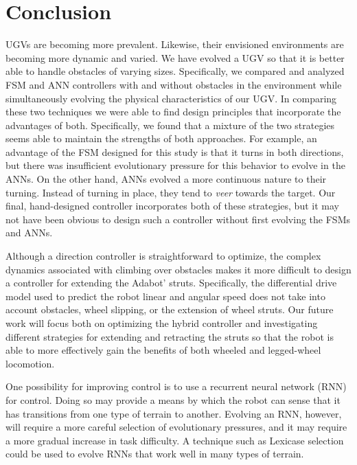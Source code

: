 \section{Conclusion}
\label{sec:conclusion}

UGVs are becoming more prevalent. Likewise, their envisioned environments are becoming more dynamic and varied.
%
We have evolved a UGV so that it is better able to handle obstacles of varying sizes.
%
Specifically, we compared and analyzed FSM and ANN controllers with and without obstacles in the environment while simultaneously evolving the physical characteristics of our UGV.
%
In comparing these two techniques we were able to find design principles that incorporate the advantages of both.
%
Specifically, we found that a mixture of the two strategies seems able to maintain the strengths of both approaches.
%
For example, an advantage of the FSM designed for this study is that it turns in both directions, but there was insufficient evolutionary pressure for this behavior to evolve in the ANNs. On the other hand, ANNs evolved a more continuous nature to their turning. Instead of turning in place, they tend to \emph{veer} towards the target.
%
Our final, hand-designed controller incorporates both of these strategies, but it may not have been obvious to design such a controller without first evolving the FSMs and ANNs.


Although a direction controller is straightforward to optimize, the complex dynamics associated with climbing over obstacles makes it more difficult to design a controller for extending the Adabot' struts.
%
Specifically, the differential drive model used to predict the robot linear and angular speed does not take into account obstacles, wheel slipping, or the extension of wheel struts.
%
Our future work will focus both on optimizing the hybrid controller and investigating different strategies for extending and retracting the struts so that the robot is able to more effectively gain the benefits of both wheeled and legged-wheel locomotion.

One possibility for improving control is to use a recurrent neural network (RNN) for control.
%
Doing so may provide a means by which the robot can sense that it has transitions from one type of terrain to another.
%
Evolving an RNN, however, will require a more careful selection of evolutionary pressures, and it may require a more gradual increase in task difficulty.
%
A technique such as Lexicase selection~\citep{Moore.2018.2CAL.TiebreaksDiversityIsolating} could be used to evolve RNNs that work well in many types of terrain.




